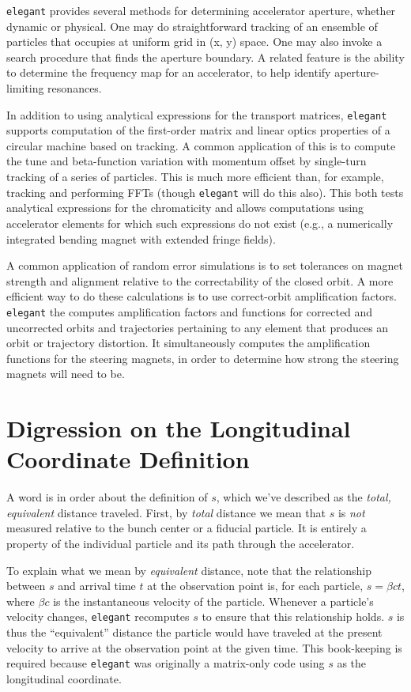 \documentclass[11pt]{article}
\begin{document}
{\tt elegant} provides several methods for determining accelerator
aperture, whether dynamic or physical.  One may do straightforward
tracking of an ensemble of particles that occupies at uniform grid in
(x, y) space.  One may also invoke a search procedure that finds the
aperture boundary.  A related feature is the ability to determine
the frequency map for an accelerator, to help identify aperture-limiting
resonances.

In addition to using analytical expressions for the transport
matrices, {\tt elegant} supports computation of the first-order matrix
and linear optics properties of a circular machine based on tracking.
A common application of this is to compute the tune and beta-function
variation with momentum offset by single-turn tracking of a series of
particles.  This is much more efficient than, for example, tracking
and performing FFTs (though {\tt elegant} will do this also).  This
both tests analytical expressions for the chromaticity and allows
computations using accelerator elements for which such expressions do
not exist (e.g., a numerically integrated bending magnet with extended
fringe fields).

A common application of random error simulations is to set tolerances
on magnet strength and alignment relative to the correctability of the
closed orbit.  A more efficient way to do these calculations is to use
correct-orbit amplification factors\cite{Borland_PC}.  {\tt elegant}
the computes amplification factors and functions for corrected and
uncorrected orbits and trajectories pertaining to any element that
produces an orbit or trajectory distortion.  It simultaneously
computes the amplification functions for the steering magnets, in
order to determine how strong the steering magnets will need to be.

\section{Digression on the Longitudinal Coordinate Definition\label{sec:longitCoord}}

A word is in order about the definition of $s$, which we've described
as the {\em total, equivalent} distance traveled.  First, by {\em
total} distance we mean that $s$ is {\em not} measured relative to the
bunch center or a fiducial particle.  It is entirely a property of the
individual particle and its path through the accelerator.

To explain what we mean by {\em equivalent} distance, note that the
relationship between $s$ and arrival time $t$ at the observation point
is, for each particle, $s = \beta c t$, where $\beta c$ is the
instantaneous velocity of the particle.  Whenever a particle's
velocity changes, {\tt elegant} recomputes $s$ to ensure that this
relationship holds.  $s$ is thus the ``equivalent'' distance the
particle would have traveled at the present velocity to arrive at the
observation point at the given time.  This book-keeping is required
because {\tt elegant} was originally a matrix-only code using $s$ as
the longitudinal coordinate.
\end{document}
